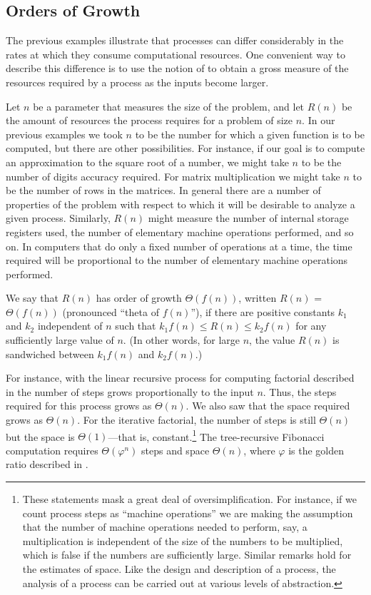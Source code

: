 \subsection{Orders of Growth}
\label{Section 1.2.3}

The previous examples illustrate that processes can differ considerably in the
rates at which they consume computational resources.  One convenient way to
describe this difference is to use the notion of  to
obtain a gross measure of the resources required by a process as the inputs
become larger.

Let \( n \) be a parameter that measures the size of the problem, and let
\( R(n) \) be the amount of resources the process requires for a problem of
size \( n \).  In our previous examples we took \( n \) to be the number for which
a given function is to be computed, but there are other possibilities.  For
instance, if our goal is to compute an approximation to the square root of a
number, we might take \( n \) to be the number of digits accuracy required.  For
matrix multiplication we might take \( n \) to be the number of rows in the
matrices.  In general there are a number of properties of the problem with
respect to which it will be desirable to analyze a given process.  Similarly,
\( R(n) \) might measure the number of internal storage registers used, the
number of elementary machine operations performed, and so on.  In computers
that do only a fixed number of operations at a time, the time required will be
proportional to the number of elementary machine operations performed.

We say that \( R(n) \) has order of growth \( \Theta(f(n)) \), written
\( R(n) \) = \( \Theta(f(n)) \) (pronounced ``theta of
\( f(n) \)''), if there are positive constants \( k_1 \) and \( k_2 \)
independent of \( n \) such that \( k_1f(n) \le R(n) \le k_2f(n) \)
for any sufficiently large value of \( n \).  (In other words, for large \( n \),
the value \( R(n) \) is sandwiched between \( k_1f(n) \) and
\( k_2f(n) \).)

\enlargethispage{\baselineskip}

For instance, with the linear recursive process for computing factorial
described in  the number of steps grows proportionally to
the input \( n \).  Thus, the steps required for this process grows as
\( \Theta(n) \).  We also saw that the space required grows as
\( \Theta(n) \).  For the iterative factorial, the number of steps is still
\( \Theta(n) \) but the space is \( \Theta(1) \)---that is,
constant.\footnote{These statements mask a great deal of oversimplification.
For instance, if we count process steps as ``machine operations'' we are making
the assumption that the number of machine operations needed to perform, say, a
multiplication is independent of the size of the numbers to be multiplied,
which is false if the numbers are sufficiently large.  Similar remarks hold for
the estimates of space.  Like the design and description of a process, the
analysis of a process can be carried out at various levels of abstraction.} The
tree-recursive Fibonacci computation requires \( \Theta(\varphi^n) \)
steps and space \( \Theta(n) \), where \( \varphi \) is the golden ratio
described in .

